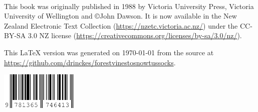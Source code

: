 \thispagestyle{empty}

~\vfill

This book was originally published in 1988 by Victoria University Press, Victoria University of Wellington and ©John Dawson.
It is now available in the New Zealand Electronic Text Collection (\url{https://nzetc.victoria.ac.nz/}) under the CC-BY-SA 3.0 NZ license (\url{https://creativecommons.org/licenses/by-sa/3.0/nz/}).

This \LaTeX{} version was generated on \today{} from the source at \url{https://github.com/drinckes/forestvinestosnowtussocks}.

\vspace{2em}
\includegraphics[width=37.4mm,keepaspectratio]{graphics/isbn.png}
